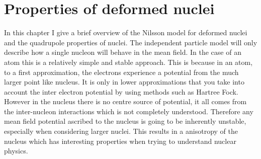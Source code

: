 \documentclass[10pt,a4paper, twoside]{report}
\begin{document}
\chapter{Properties of deformed nuclei} \label{chap:Deformed}
 In this chapter I give a brief overview of the Nilsson model for deformed nuclei and the quadrupole properties of nuclei. The independent particle model will only describe how a single nucleon will behave in the mean field. In the case of an atom this is a relatively simple and stable approach. This is because in an atom, to a first approximation, the electrons experience a potential from the much larger point like nucleus. It is only in lower approximations that you take into account the inter electron potential by using methods such as Hartree Fock. However in the nucleus there is no centre source of potential, it all comes from the inter-nucleon interactions which is not completely understood. Therefore any mean field potential ascribed to the nucleus is going to be inherently unstable, especially when considering larger nuclei. This results in a anisotropy of the nucleus which has interesting properties when trying to understand nuclear physics. 
\end{document}

